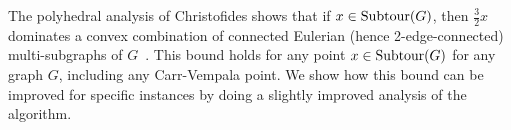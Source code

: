 
The polyhedral analysis of Christofides shows that if $x\in \operatorname{{Subtour}}(G)$, then $\frac{3}{2}x$ dominates a convex combination of connected Eulerian (hence 2-edge-connected) multi-subgraphs of $G$~\cite{wolsey,shmoyswilliamson}. This bound holds for any point $x\in \operatorname{{Subtour}}(G)$ for any graph $G$, including any Carr-Vempala point. We show how this bound can be improved for specific instances by doing a slightly improved analysis of the algorithm.

